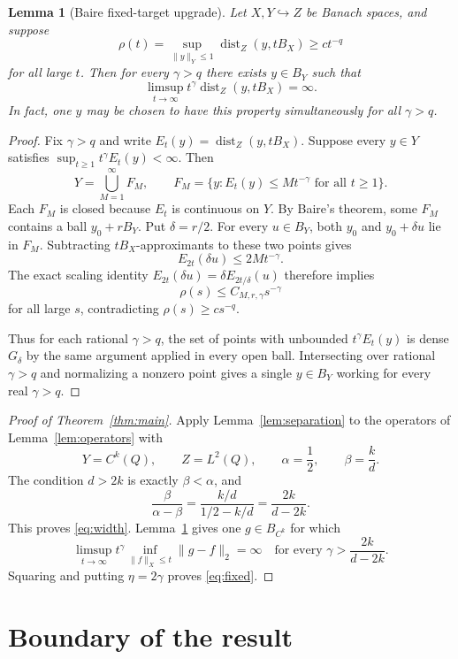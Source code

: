 \documentclass[11pt]{article}
\newtheorem{lemma}[theorem]{Lemma}
\newcommand{\dist}{\operatorname{dist}}
\begin{document}
\begin{lemma}[Baire fixed-target upgrade]\label{lem:baire}
Let $X,Y\hookrightarrow Z$ be Banach spaces, and suppose
\[
 \rho(t)=\sup_{\|y\|_Y\le1}\dist_Z(y,tB_X)\ge c t^{-q}
\]
for all large $t$.  Then for every $\gamma>q$ there exists $y\in B_Y$ such
that
\[
 \limsup_{t\to\infty}t^\gamma\dist_Z(y,tB_X)=\infty.
\]
In fact, one $y$ may be chosen to have this property simultaneously for all
$\gamma>q$.
\end{lemma}

\begin{proof}
Fix $\gamma>q$ and write $E_t(y)=\dist_Z(y,tB_X)$.  Suppose every $y\in Y$
satisfies $\sup_{t\ge1}t^\gamma E_t(y)<\infty$.  Then
\[
 Y=\bigcup_{M=1}^\infty F_M,
 \qquad
 F_M=\{y:E_t(y)\le Mt^{-\gamma}\text{ for all }t\ge1\}.
\]
Each $F_M$ is closed because $E_t$ is continuous on $Y$.  By Baire's theorem,
some $F_M$ contains a ball $y_0+rB_Y$.  Put $\delta=r/2$.  For every
$u\in B_Y$, both $y_0$ and $y_0+\delta u$ lie in $F_M$.  Subtracting
$tB_X$-approximants to these two points gives
\[
 E_{2t}(\delta u)\le2Mt^{-\gamma}.
\]
The exact scaling identity
$E_{2t}(\delta u)=\delta E_{2t/\delta}(u)$ therefore implies
\[
 \rho(s)\le C_{M,r,\gamma}s^{-\gamma}
\]
for all large $s$, contradicting $\rho(s)\ge cs^{-q}$.

Thus for each rational $\gamma>q$, the set of points with unbounded
$t^\gamma E_t(y)$ is dense $G_\delta$ by the same argument applied in every
open ball.  Intersecting over rational $\gamma>q$ and normalizing a nonzero
point gives a single $y\in B_Y$ working for every real $\gamma>q$.
\end{proof}

\begin{proof}[Proof of Theorem~\ref{thm:main}]
Apply Lemma~\ref{lem:separation} to the operators of
Lemma~\ref{lem:operators} with
\[
 Y=C^k(Q),\qquad Z=L^2(Q),\qquad
 \alpha=\frac12,\qquad\beta=\frac{k}{d}.
\]
The condition $d>2k$ is exactly $\beta<\alpha$, and
\[
 \frac{\beta}{\alpha-\beta}
 =\frac{k/d}{1/2-k/d}=\frac{2k}{d-2k}.
\]
This proves \eqref{eq:width}.  Lemma~\ref{lem:baire} gives one
$g\in B_{C^k}$ for which
\[
 \limsup_{t\to\infty}t^\gamma
 \inf_{\|f\|_X\le t}\|g-f\|_2=\infty
 \quad\text{for every }\gamma>\frac{2k}{d-2k}.
\]
Squaring and putting $\eta=2\gamma$ proves \eqref{eq:fixed}.
\end{proof}

\section{Boundary of the result}
\end{document}
